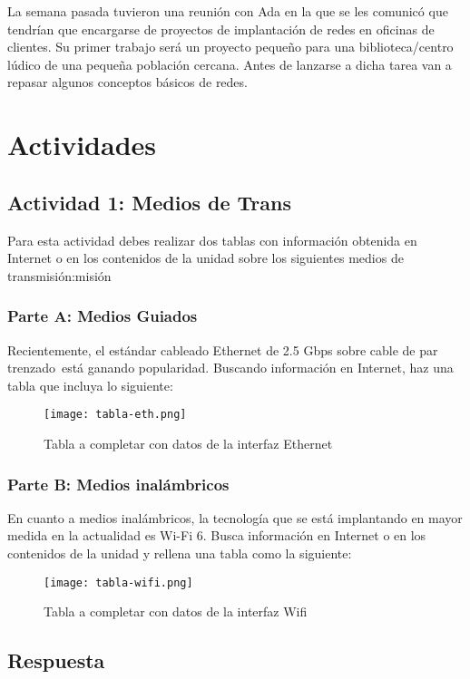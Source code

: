 La semana pasada tuvieron una reunión con Ada en la que se les comunicó que tendrían que encargarse de proyectos de implantación de redes en oficinas de clientes. Su primer trabajo será un proyecto pequeño para una biblioteca/centro lúdico de una pequeña población cercana. Antes de lanzarse a dicha tarea van a repasar algunos conceptos básicos de redes.

\section{Actividades}

\subsection{Actividad 1: Medios de Trans}

Para esta actividad debes realizar dos tablas con información obtenida en Internet o en los contenidos de la unidad sobre los siguientes medios de transmisión:misión

\subsubsection*{Parte A: Medios Guiados}
Recientemente, el estándar cableado Ethernet de 2.5 Gbps sobre cable de par trenzado está ganando popularidad. Buscando información en Internet, haz una tabla que incluya lo siguiente:

\begin{figure}[H]
    \centering
    \texttt{[image: tabla-eth.png]}
    \caption{Tabla a completar con datos de la interfaz Ethernet}
\end{figure}

\subsubsection*{Parte B: Medios inalámbricos}
En cuanto a medios inalámbricos, la tecnología que se está implantando en mayor medida en la actualidad es Wi-Fi 6. Busca información en Internet o en los contenidos de la unidad y rellena una tabla como la siguiente:

\begin{figure}[H]
    \centering
    \texttt{[image: tabla-wifi.png]}
    \caption{Tabla a completar con datos de la interfaz Wifi}
\end{figure}

\subsection{Respuesta}

